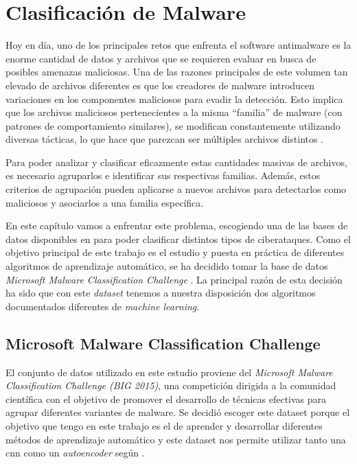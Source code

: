 \chapter{Clasificación de Malware} \label{Capitulo_3}

Hoy en día, uno de los principales retos que enfrenta el software antimalware es la enorme cantidad de datos y archivos que se requieren evaluar en busca de posibles amenazas maliciosas. Una de las razones principales de este volumen tan elevado de archivos diferentes es que los creadores de malware introducen variaciones en los componentes maliciosos para evadir la detección. Esto implica que los archivos maliciosos pertenecientes a la misma ``familia'' de malware (con patrones de comportamiento similares), se modifican constantemente utilizando diversas tácticas, lo que hace que parezcan ser múltiples archivos distintos \citep{kagglebig2015}. 


Para poder analizar y clasificar eficazmente estas cantidades masivas de archivos, es necesario agruparlos e identificar sus respectivas familias. Además, estos criterios de agrupación pueden aplicarse a nuevos archivos para detectarlos como maliciosos y asociarlos a una familia específica. 


En este capítulo vamos a enfrentar este problema, escogiendo una de las bases de datos disponibles en \citep{podder2021artificial} para poder clasificar distintos tipos de ciberataques. Como el objetivo principal de este trabajo es el estudio y puesta en práctica de diferentes algoritmos de aprendizaje automático, se ha decidido tomar la base de datos \textit{Microsoft Malware Classification Challenge} \citep{kagglebig2015}. La principal razón de esta decisión ha sido que con este \textit{dataset} tenemos a nuestra disposición dos algoritmos documentados diferentes de \textit{machine learning}. 



\section{Microsoft Malware Classification Challenge}



El conjunto de datos utilizado en este estudio proviene del \textit{Microsoft Malware Classification Challenge (BIG 2015)}, una competición dirigida a la comunidad científica con el objetivo de promover el desarrollo de técnicas efectivas para agrupar diferentes variantes de malware. Se decidió escoger este dataset porque el objetivo que tengo en este trabajo es el de aprender y desarrollar diferentes métodos de aprendizaje automático y este dataset nos permite utilizar tanto una \acrshort{cnn} como un \textit{autoencoder} según \citep{podder2021artificial}. 

